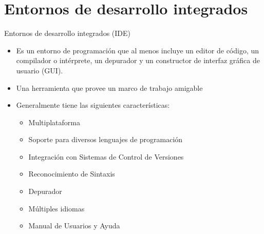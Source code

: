 \section{Entornos de desarrollo integrados}

\begin{frame}[c]{Entornos de desarrollo integrados (IDE)}
  \begin{itemize}
    \item Es un entorno de programación que al menos incluye un editor de
      código, un compilador o intérprete, un depurador y un constructor de
      interfaz gráfica de usuario (GUI).
    \pausa
    \item Una herramienta que provee un marco de trabajo amigable
    \pausa
    \item Generalmente tiene las siguientes características:
      \begin{itemize}
        \item Multiplataforma
        \pausa
        \item Soporte para diversos lenguajes de programación
        \pausa
        \item Integración con Sistemas de Control de Versiones
        \pausa
        \item Reconocimiento de Sintaxis
        \pausa
        \item Depurador
        \pausa
        \item Múltiples idiomas
        \pausa
        \item Manual de Usuarios y Ayuda
      \end{itemize}
  \end{itemize}
\end{frame}
